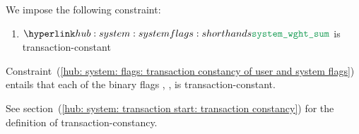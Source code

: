 We impose the following constraint:
\begin{enumerate}
	\item \label{hub: system: flags: transaction constancy of user and system flags}
		$\weightedFlagSum$ is transaction-constant
\end{enumerate}
\saNote{}\label{hub: system: flags: individual flags are transaction constant}
Constraint~(\ref{hub: system: flags: transaction constancy of user and system flags})
entails that each of the binary flags
\sysi{},
\user{},
\sysf{}
is transaction-constant.

\saNote{}
See section~(\ref{hub: system: transaction start: transaction constancy}) for the definition of transaction-constancy.
